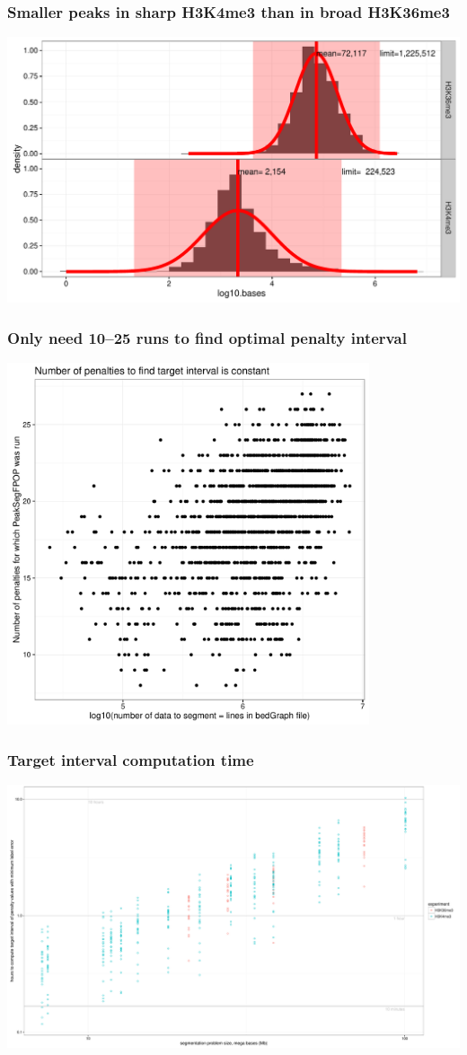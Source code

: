 \documentclass{beamer}
\begin{document}
\begin{frame}
  \frametitle{Smaller peaks in sharp H3K4me3 than in broad H3K36me3}
  \includegraphics[width=\textwidth]{figure-peak-size-model}
\end{frame}

\begin{frame}
  \frametitle{Only need 10--25 runs to find optimal penalty interval}
  \includegraphics[width=0.8\textwidth]{figure-timing-data-penalties}
\end{frame}

\begin{frame}
  \frametitle{Target interval computation time}
  \includegraphics[width=\textwidth]{figure-target-interval-time}
\end{frame}
\end{document}
